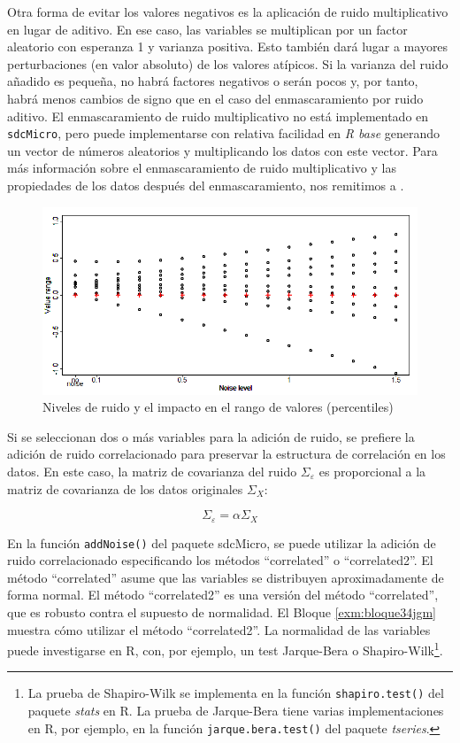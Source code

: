 \documentclass[]{book}
\theoremstyle{definition}
\theoremstyle{definition}
\theoremstyle{definition}
\theoremstyle{definition}
\theoremstyle{remark}
\begin{document}
Otra forma de evitar los valores negativos es la aplicación de ruido multiplicativo en lugar de aditivo. En ese caso, las variables se multiplican por un factor aleatorio con esperanza 1 y varianza positiva. Esto también dará lugar a mayores perturbaciones (en valor absoluto) de los valores atípicos. Si la varianza del ruido añadido es pequeña, no habrá factores negativos o serán pocos y, por tanto, habrá menos cambios de signo que en el caso del enmascaramiento por ruido aditivo. El enmascaramiento de ruido multiplicativo no está implementado en \texttt{sdcMicro}, pero puede implementarse con relativa facilidad en \emph{R base} generando un vector de números aleatorios y multiplicando los datos con este vector. Para más información sobre el enmascaramiento de ruido multiplicativo y las propiedades de los datos después del enmascaramiento, nos remitimos a \citep{KiWi03}.

\begin{figure}
\includegraphics[width=1\linewidth]{Imagenes/image10} \caption{Niveles de ruido y el impacto en el rango de valores (percentiles)}\label{fig:fig11}
\end{figure}

Si se seleccionan dos o más variables para la adición de ruido, se prefiere la adición de ruido correlacionado para preservar la estructura de correlación en los datos. En este caso, la matriz de covarianza del ruido \(\Sigma_{\varepsilon}\) es proporcional a la matriz de covarianza de los datos originales \(\Sigma_{X}\):

\[\Sigma_{\varepsilon} = \alpha \Sigma_{X}\]

En la función \texttt{addNoise()} del paquete sdcMicro, se puede utilizar la adición de ruido correlacionado especificando los métodos ``correlated'' o ``correlated2''. El método ``correlated'' asume que las variables se distribuyen aproximadamente de forma normal. El método ``correlated2'' es una versión del método ``correlated'', que es robusto contra el supuesto de normalidad. El Bloque \ref{exm:bloque34jgm} muestra cómo utilizar el método ``correlated2''. La normalidad de las variables puede investigarse en R, con, por ejemplo, un test Jarque-Bera o Shapiro-Wilk\footnote{La prueba de Shapiro-Wilk se implementa en la función \texttt{shapiro.test()} del paquete \emph{stats} en R. La prueba de Jarque-Bera tiene varias implementaciones en R, por ejemplo, en la función \texttt{jarque.bera.test()} del paquete \emph{tseries}.}.
\end{document}
